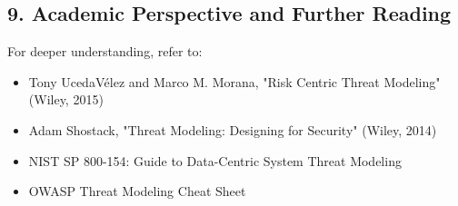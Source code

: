 \subsection*{9. Academic Perspective and Further Reading}
For deeper understanding, refer to:
\begin{itemize}
	\item Tony UcedaVélez and Marco M. Morana, "Risk Centric Threat Modeling" (Wiley, 2015)
	\item Adam Shostack, "Threat Modeling: Designing for Security" (Wiley, 2014)
	\item NIST SP 800-154: Guide to Data-Centric System Threat Modeling
	\item OWASP Threat Modeling Cheat Sheet
\end{itemize}
